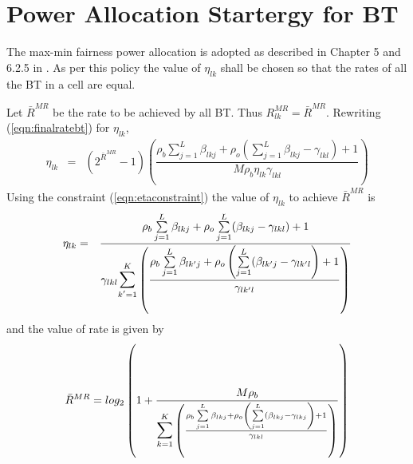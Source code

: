 \documentclass[10pt, a4paper, twoside,fleqn]{article}
\begin{document}
\section{Power Allocation Startergy for BT}
The max-min fairness power allocation is adopted as described in Chapter 5 and 6.2.5 in \cite{bib:MassiveMimoBook}. As per this policy the value of $\eta_{lk}$ shall be chosen so that the rates of all the BT in a cell are equal. 

Let $\bar{R}^{MR}$ be the rate to be achieved by all BT. Thus $R_{lk}^{MR} = \bar{R}^{MR}$. Rewriting (\ref{eqn:finalratebt}) for $\eta_{lk}$,
\begin{eqnarray}
    \eta_{lk} &=& (2^{\bar{R}^{MR}} - 1)\left(\dfrac{\rho_b\sum\limits_{j=1}^{L}\beta_{lkj}+\rho_o\left(\sum\limits_{j=1}^{L}\beta_{lkj} -\gamma_{lkl}\right)+1}{M\rho_b\eta_{lk}\gamma_{lkl}}\right)
\end{eqnarray}
Using the constraint (\ref{eqn:etaconstraint}) the value of $\eta_{lk}$ to achieve $\bar{R}^{MR}$ is
\begin{eqnarray}
    \eta_{lk} &=& \frac{\rho_b\sum\limits_{j=1}^{L}\beta_{lkj}+\rho_o\sum\limits_{j=1}^{L}(\beta_{lkj} -\gamma_{lkl})+1}{\gamma_{lkl}\mathlarger{\mathlarger{\sum}}\limits_{k'=1}^{K}\left(\dfrac{\rho_b\sum\limits_{j=1}^{L}\beta_{lk'j}+\rho_o\left(\sum\limits_{j=1}^{L}(\beta_{lk'j} -\gamma_{lk'l}\right)+1}{\gamma_{lk'l}}\right)}
\end{eqnarray}
and the value of rate is given by
\begin{eqnarray}
    \bar{R}^{MR} =log_2\left(1+\frac{M\rho_b}{\mathlarger{\mathlarger{\sum}}\limits_{k=1}^{K}\left(\frac{\rho_b\sum\limits_{j=1}^{L}\beta_{lkj}+\rho_o\left(\sum\limits_{j=1}^{L}(\beta_{lkj} -\gamma_{lkj}\right)+1}{\gamma_{lkl}}\right)} \right)
\end{eqnarray}
  
\end{document}
